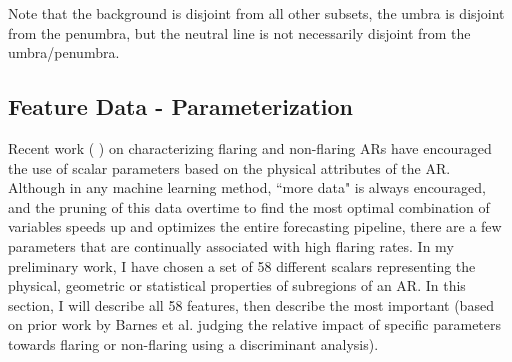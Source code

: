 Note that the background is disjoint from all other subsets, the umbra is disjoint from the penumbra, but the neutral line is not necessarily disjoint from the umbra/penumbra.

\subsection{Feature Data - Parameterization}
Recent work (\cite{Properties1} \cite{Properties2} \cite{schrijver}) on characterizing flaring and non-flaring ARs have encouraged the use of scalar parameters based on the physical attributes of the AR. Although in any machine learning method, ``more data" is always encouraged, and the pruning of this data overtime to find the most optimal combination of variables speeds up and optimizes the entire forecasting pipeline, there are a few parameters that are continually associated with high flaring rates. In my preliminary work, I have chosen a set of 58 different scalars representing the physical, geometric or statistical properties of subregions of an AR. In this section, I will describe all 58 features, then describe the most important (based on prior work by Barnes et al. \cite{Properties1} \cite{Properties2} judging the relative impact of specific parameters towards flaring or non-flaring using a discriminant analysis).

